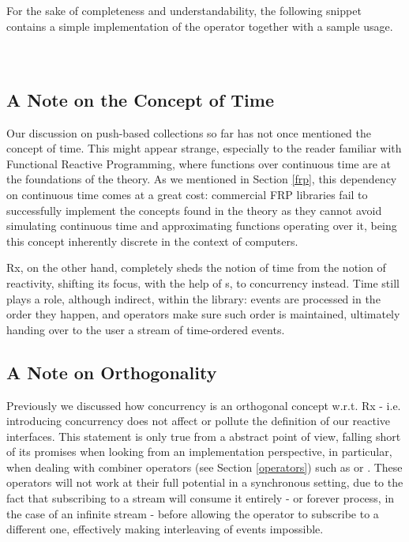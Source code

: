 For the sake of completeness and understandability, the following snippet contains a simple implementation of the  operator together with a sample usage.\\

\\

\\


\subsection{A Note on the Concept of Time}

Our discussion on push-based collections so far has not once mentioned the concept of time. This might appear strange, especially to the reader familiar with Functional Reactive Programming, where functions over continuous time are at the foundations of the theory. As we mentioned in Section \ref{frp}, this dependency on continuous time comes at a great cost: commercial FRP libraries fail to successfully implement the concepts found in the theory as they cannot avoid simulating continuous time and approximating functions operating over it, being this concept inherently discrete in the context of computers.

Rx, on the other hand, completely sheds the notion of time from the notion of reactivity\cite{meijer2010observable}, shifting its focus, with the help of s, to concurrency instead. Time still plays a role, although indirect, within the library: events are processed in the order they happen, and operators make sure such order is maintained, ultimately handing over to the user a stream of time-ordered events.

\subsection{A Note on Orthogonality}

Previously we discussed how concurrency is an orthogonal concept w.r.t. Rx - i.e. introducing concurrency does not affect or pollute the definition of our reactive interfaces. This statement is only true from a abstract point of view, falling short of its promises when looking from an implementation perspective, in particular, when dealing with combiner operators (see Section \ref{operators}) such as \code{(>>=)} or . These operators will not work at their full potential in a synchronous setting, due to the fact that subscribing to a stream will consume it entirely - or forever process, in the case of an infinite stream - before allowing the operator to subscribe to a different one, effectively making interleaving of events impossible. 

